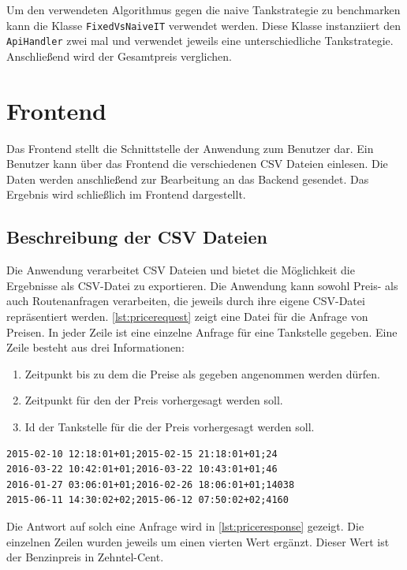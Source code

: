 \documentclass[
ngerman          %
,a4paper          %
,11pt
,pdftex
]{report}
\begin{document}
Um den verwendeten Algorithmus gegen die naive Tankstrategie zu benchmarken kann die Klasse \texttt{FixedVsNaiveIT} verwendet werden. Diese Klasse instanziiert den \texttt{ApiHandler} zwei mal und verwendet jeweils eine unterschiedliche Tankstrategie. Anschließend wird der Gesamtpreis verglichen.

\newpage
\section{Frontend}

Das Frontend stellt die Schnittstelle der Anwendung zum Benutzer dar. Ein Benutzer kann über das Frontend die verschiedenen \ac{CSV} Dateien einlesen. Die Daten werden anschließend zur Bearbeitung an das Backend gesendet. Das Ergebnis wird schließlich im Frontend dargestellt.

\subsection{Beschreibung der CSV Dateien}

Die Anwendung verarbeitet \ac{CSV} Dateien und bietet die Möglichkeit die Ergebnisse als \ac{CSV}-Datei zu exportieren. Die Anwendung kann sowohl Preis- als auch Routenanfragen verarbeiten, die jeweils durch ihre eigene \ac{CSV}-Datei repräsentiert werden. \ref{lst:pricerequest} zeigt eine Datei für die Anfrage von Preisen. In jeder Zeile ist eine einzelne Anfrage für eine Tankstelle gegeben. Eine Zeile besteht aus drei Informationen:

\begin{enumerate}
    \item Zeitpunkt bis zu dem die Preise als gegeben angenommen werden dürfen.
    \item Zeitpunkt für den der Preis vorhergesagt werden soll.
    \item Id der Tankstelle für die der Preis vorhergesagt werden soll.
\end{enumerate}

\begin{lstlisting}[caption={CSV einer Preisanfrage}, label={lst:pricerequest}]
2015-02-10 12:18:01+01;2015-02-15 21:18:01+01;24
2016-03-22 10:42:01+01;2016-03-22 10:43:01+01;46
2016-01-27 03:06:01+01;2016-02-26 18:06:01+01;14038
2015-06-11 14:30:02+02;2015-06-12 07:50:02+02;4160
\end{lstlisting}

Die Antwort auf solch eine Anfrage wird in \ref{lst:priceresponse} gezeigt. Die einzelnen Zeilen wurden jeweils um einen vierten Wert ergänzt. Dieser Wert ist der Benzinpreis in Zehntel-Cent.
\end{document}
